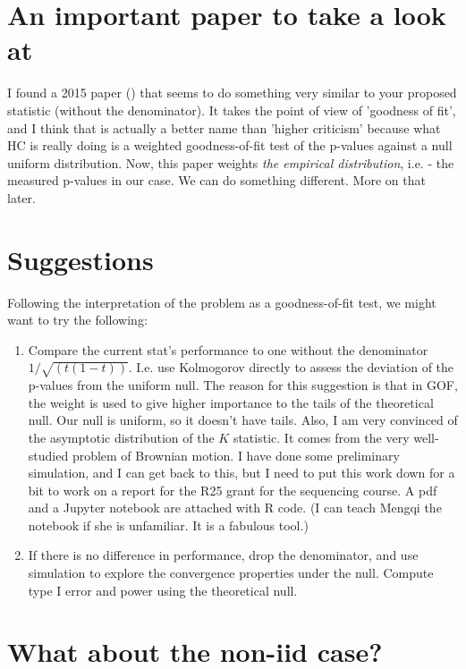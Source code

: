 \documentclass[11pt]{article}
\begin{document}
\section{An important paper to take a look at}

I found a 2015 paper (\cite{KSGene}) that seems to do something very similar to your proposed statistic (without the denominator). It takes the point of view of 'goodness of fit', and I think that is actually a better name than 'higher criticism' because what HC is really doing is a weighted goodness-of-fit test of the p-values against a null uniform distribution. Now, this paper weights \emph{the empirical distribution}, i.e. - the measured p-values in our case. We can do something different. More on that later.
\section{Suggestions}

Following the interpretation of the problem as a goodness-of-fit test, we might want to try the following:

\begin{enumerate}
\item Compare the current stat's performance to one without the denominator $1/\sqrt{(t(1-t))}$. I.e. use Kolmogorov directly to assess the deviation of the p-values from the uniform null. The reason for this suggestion is that in GOF, the weight is used to give higher importance to the tails of the theoretical null. Our null is uniform, so it doesn't have tails. Also, I am very convinced of the asymptotic distribution of the $K$ statistic. It comes from the very well-studied problem of Brownian motion. I have done some preliminary simulation, and I can get back to this, but I need to put this work down for a bit to work on a report for the R25 grant for the sequencing course. A pdf and a Jupyter notebook are attached with R code. (I can teach Mengqi the notebook if she is unfamiliar. It is a fabulous tool.)

\item If there is no difference in performance, drop the denominator, and use simulation to explore the convergence properties under the null. Compute type I error and power using the theoretical null.

\end{enumerate} 

\section{What about the non-iid case?}
\end{document}
